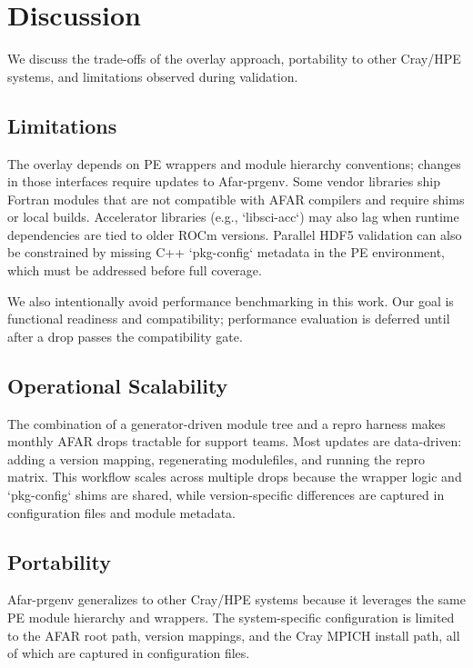\section{Discussion}
\label{sec:discussion}
We discuss the trade-offs of the overlay approach, portability to other Cray/HPE
systems, and limitations observed during validation.

\subsection{Limitations}
\label{sec:limitations}
The overlay depends on PE wrappers and module hierarchy conventions; changes in
those interfaces require updates to Afar-prgenv. Some vendor libraries ship
Fortran modules that are not compatible with AFAR compilers and require shims
or local builds. Accelerator libraries (e.g., `libsci-acc`) may also lag when
runtime dependencies are tied to older ROCm versions.
Parallel HDF5 validation can also be constrained by missing C++ `pkg-config`
metadata in the PE environment, which must be addressed before full coverage.

We also intentionally avoid performance benchmarking in this work. Our goal is
functional readiness and compatibility; performance evaluation is deferred
until after a drop passes the compatibility gate.

\subsection{Operational Scalability}
\label{sec:scalability}
The combination of a generator-driven module tree and a repro harness makes
monthly AFAR drops tractable for support teams. Most updates are data-driven:
adding a version mapping, regenerating modulefiles, and running the repro
matrix. This workflow scales across multiple drops because the wrapper logic
and `pkg-config` shims are shared, while version-specific differences are
captured in configuration files and module metadata.

\subsection{Portability}
\label{sec:portability}
Afar-prgenv generalizes to other Cray/HPE systems because it leverages the same
PE module hierarchy and wrappers. The system-specific configuration is limited
to the AFAR root path, version mappings, and the Cray MPICH install path, all
of which are captured in configuration files.

